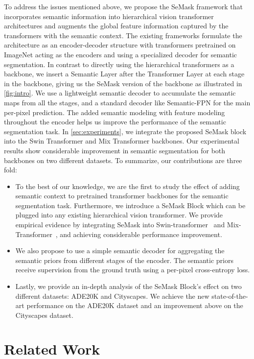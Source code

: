 \documentclass[10pt,twocolumn,letterpaper]{article}
\begin{document}
To address the issues mentioned above, we propose the SeMask framework that incorporates semantic information into hierarchical vision transformer architectures and augments the global feature information captured by the transformers with the semantic context. The existing frameworks formulate the architecture as an encoder-decoder structure with transformers pretrained on ImageNet \cite{imagenet} acting as the encoders and using a specialized decoder for semantic segmentation. In contrast to directly using the hierarchical transformers as a backbone, we insert a Semantic Layer after the Transformer Layer at each stage in the backbone, giving us the SeMask version of the backbone as illustrated in \cref{fig:intro}. We use a lightweight semantic decoder to accumulate the semantic maps from all the stages, and a standard decoder like Semantic-FPN \cite{sem-fpn} for the main per-pixel prediction. The added semantic modeling with feature modeling throughout the encoder helps us improve the performance of the semantic segmentation task. In \cref{sec:experiments}, we integrate the proposed SeMask block into the Swin Transformer \cite{swin-T} and Mix Transformer \cite{segformer} backbones. Our experimental results show considerable improvement in semantic segmentation for both backbones on two different datasets. To summarize, our contributions are three fold:  



\begin{itemize}
    \item To the best of our knowledge, we are the first to study the effect of adding semantic context to pretrained transformer backbones for the semantic segmentation task. Furthermore, we introduce a SeMask Block which can be plugged into any existing hierarchical vision transformer. We provide empirical evidence by integrating SeMask into Swin-transformer~\cite{swin-T} and Mix-Transformer~\cite{segformer}, and achieving considerable performance improvement.
\item We also propose to use a simple semantic decoder for aggregating the semantic priors from different stages of the encoder. The semantic priors receive supervision from the ground truth using a per-pixel cross-entropy loss.
    \item Lastly, we provide an in-depth analysis of the SeMask Block's effect on two different datasets: ADE20K and Cityscapes. We achieve the new state-of-the-art performance on the ADE20K dataset and an improvement above  on the Cityscapes dataset.
\end{itemize} \section{Related Work}
\end{document}
